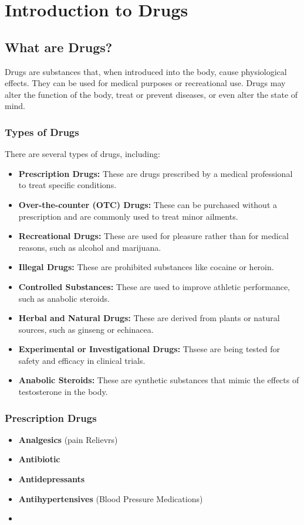 \chapter{Introduction to Drugs}

\section{What are Drugs?}
Drugs are substances that, when introduced into the body, cause physiological effects. They can be used for medical purposes or recreational use. Drugs may alter the function of the body, treat or prevent diseases, or even alter the state of mind. 

\subsection{Types of Drugs}
There are several types of drugs, including:
\begin{itemize}
    \item \textbf{Prescription Drugs:} These are drugs prescribed by a medical professional to treat specific conditions.
    \item \textbf{Over-the-counter (OTC) Drugs:} These can be purchased without a prescription and are commonly used to treat minor ailments.
    \item \textbf{Recreational Drugs:} These are used for pleasure rather than for medical reasons, such as alcohol and marijuana.
    \item \textbf{Illegal Drugs:} These are prohibited substances like cocaine or heroin.
    \item \textbf{Controlled Substances:} These are used to improve athletic performance, such as anabolic steroids.
    \item \textbf{Herbal and Natural Drugs:} These are derived from plants or natural sources, such as ginseng or echinacea.
    \item \textbf{Experimental or Investigational Drugs:} Thsese are being tested for safety and efficacy in clinical trials.
    \item \textbf{Anabolic Steroids:} These are synthetic substances that mimic the effects of testosterone in the body.
\end{itemize}

\subsection{Prescription Drugs}

\begin{itemize}
    \item \textbf{Analgesics} (pain Relievrs)
    \item \textbf{Antibiotic}
    \item \textbf{Antidepressants}
    \item \textbf{Antihypertensives} (Blood Pressure Medications)
    \item 
\end{itemize}



